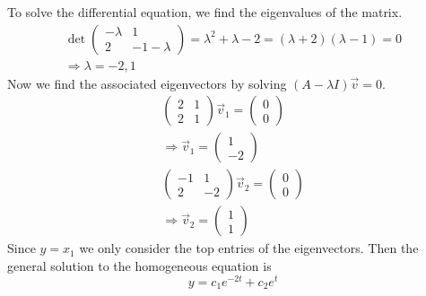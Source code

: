 \documentclass[11pt, titlepage]{article}
\begin{document}
\begin{enumerate}
\begin{solution}
            To solve the differential equation, we find the eigenvalues of the matrix.
            \begin{gather*}
                \det
                \begin{pmatrix}
                    -\lambda & 1 \\
                    2 & -1 - \lambda
                \end{pmatrix} = \lambda^2 + \lambda - 2 = (\lambda + 2)(\lambda - 1) = 0 \\
                \Longrightarrow \lambda = -2, 1
            \end{gather*}
            Now we find the associated eigenvectors by solving $(A - \lambda I) \vec{v} = 0$.
            \begin{gather*}
                \begin{pmatrix}
                    2 & 1 \\
                    2 & 1
                \end{pmatrix} \vec{v}_1 =
                \begin{pmatrix}
                    0 \\
                    0
                \end{pmatrix} \\
                \Longrightarrow
                \vec{v}_1 =
                \begin{pmatrix}
                    1 \\
                    -2
                \end{pmatrix} \\
                \begin{pmatrix}
                    -1 & 1 \\
                    2 & -2
                \end{pmatrix} \vec{v}_2 =
                \begin{pmatrix}
                    0 \\
                    0
                \end{pmatrix} \\
                \Longrightarrow
                \vec{v}_2 =
                \begin{pmatrix}
                    1 \\
                    1
                \end{pmatrix}
            \end{gather*}
            Since $y = x_1$ we only consider the top entries of the eigenvectors.
            Then the general solution to the homogeneous equation is
            \[
            y = c_1 e^{-2t} + c_2 e^{t}
            \]


\end{solution}
\end{enumerate}
\end{document}
